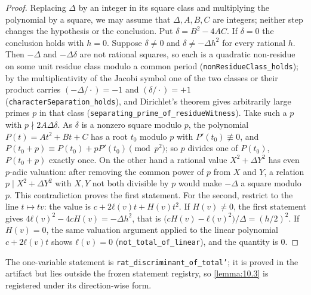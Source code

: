 \begin{proof}
Replacing $Δ$ by an integer in its square class and multiplying the polynomial by a square, we may assume that $Δ, A, B, C$ are integers; neither step changes the hypothesis or the conclusion. Put $δ = B^{2} - 4AC$. If $δ = 0$ the conclusion holds with $h = 0$. Suppose $δ ≠ 0$ and $δ ≠ -Δh^{2}$ for every rational $h$. Then $-Δ$ and $-Δδ$ are not rational squares, so each is a quadratic non-residue on some unit residue class modulo a common period (\texttt{nonResidueClass\_holds}); by the multiplicativity of the Jacobi symbol one of the two classes or their product carries $(-Δ/\cdot) = -1$ and $(δ/\cdot) = +1$ (\texttt{characterSeparation\_holds}), and Dirichlet's theorem gives arbitrarily large primes $p$ in that class (\texttt{separating\_prime\_of\_residueWitness}). Take such a $p$ with $p ∤ 2AΔδ$. As $δ$ is a nonzero square modulo $p$, the polynomial $P(t) = At^{2} + Bt + C$ has a root $t_{0}$ modulo $p$ with $P'(t_{0}) ≢ 0$, and $P(t_{0} + p) ≡ P(t_{0}) + pP'(t_{0}) \pmod{p^{2}}$; so $p$ divides one of $P(t_{0})$, $P(t_{0} + p)$ exactly once. On the other hand a rational value $X^{2} + ΔY^{2}$ has even $p$-adic valuation: after removing the common power of $p$ from $X$ and $Y$, a relation $p ∣ X^{2} + ΔY^{2}$ with $X, Y$ not both divisible by $p$ would make $-Δ$ a square modulo $p$. This contradiction proves the first statement. For the second, restrict to the line $t ↦ tv$: the value is $c + 2ℓ(v)t + H(v)t^{2}$. If $H(v) ≠ 0$, the first statement gives $4ℓ(v)^{2} - 4cH(v) = -Δh^{2}$, that is $\big(cH(v) - ℓ(v)^{2}\big)/Δ = (h/2)^{2}$. If $H(v) = 0$, the same valuation argument applied to the linear polynomial $c + 2ℓ(v)t$ shows $ℓ(v) = 0$ (\texttt{not\_total\_of\_linear}), and the quantity is $0$.
\end{proof}

The one-variable statement is \texttt{rat\_discriminant\_of\_total'}; it is proved in the artifact but lies outside the frozen statement registry, so \cref{lemma:10.3} is registered under its direction-wise form.


